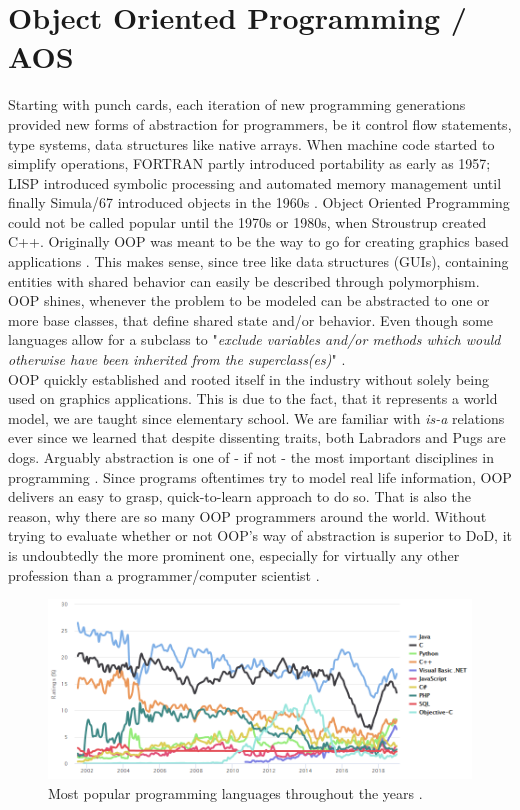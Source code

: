 \section{Object Oriented Programming / AOS}\label{OOP}
Starting with punch cards, each iteration of new programming generations provided new forms of abstraction for programmers, be it control flow statements, type systems, data structures like native arrays. When machine code started to simplify operations, FORTRAN partly introduced portability as early as 1957; LISP introduced symbolic processing and automated memory management until finally Simula/67 introduced objects in the 1960s .
Object Oriented Programming could not be called popular until the 1970s or 1980s, when Stroustrup created C++. Originally OOP was meant to be the way to go for creating graphics based applications  . This makes sense, since tree like data structures (GUIs), containing entities with shared behavior can easily be described through polymorphism.\\
OOP shines, whenever the problem to be modeled can be abstracted to one or more base classes, that define shared state and/or behavior. Even though some languages allow for a subclass to "\textit{exclude variables and/or methods which would otherwise have been inherited from the superclass(es)}" .\\
OOP quickly established and rooted itself in the industry without solely being used on graphics applications. This is due to the fact, that it represents a world model, we are taught since elementary school. We are familiar with \textit{is-a} relations ever since we learned that despite dissenting traits, both Labradors and Pugs are dogs. Arguably abstraction is one of - if not - the most important disciplines in programming . Since programs oftentimes try to model real life information, OOP delivers an easy to grasp, quick-to-learn approach to do so. That is also the reason, why there are so many OOP programmers around the world. Without trying to evaluate whether or not OOP's way of abstraction is superior to DoD, it is undoubtedly the more prominent one, especially for virtually any other profession than a programmer/computer scientist .
\begin{figure}[!htbp]
	\centering
	\includegraphics[width=1.0\linewidth]{PICs/lang_ratings}
	\caption{Most popular programming languages throughout the years .}\label{lang_ratings}
\end{figure}
